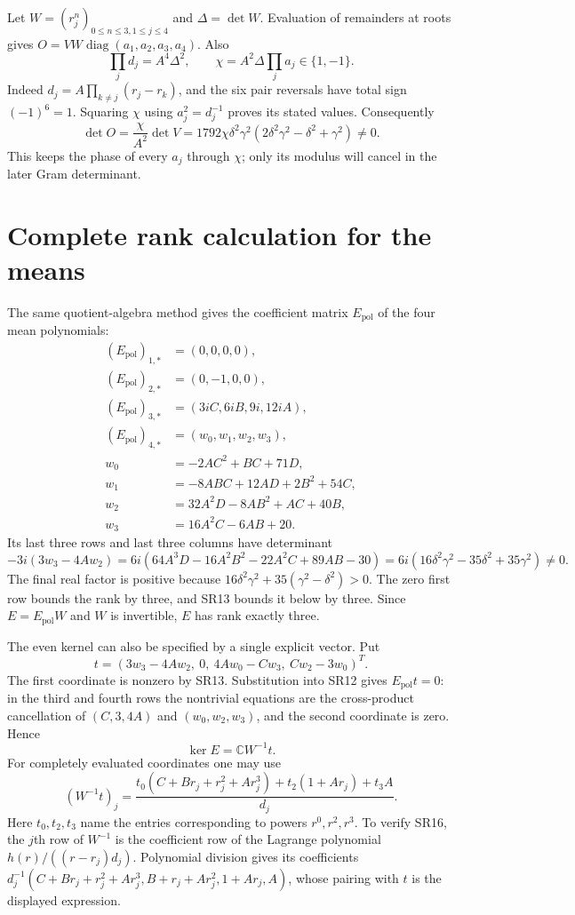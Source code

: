 \documentclass[11pt]{article}
\newcommand{\C}{\mathbb C}
\newcommand{\diag}{\operatorname{diag}}
\begin{document}
Let $W=(r_j^n)_{0\le n\le3,1\le j\le4}$ and $\Delta=\det W$.
Evaluation of remainders at roots gives
$O=VW\diag(a_1,a_2,a_3,a_4)$. Also
\[
 \prod_jd_j=A^4\Delta^2,\qquad
 \chi=A^2\Delta\prod_ja_j\in\{1,-1\}.
 \tag{SR10}
\]
Indeed $d_j=A\prod_{k\ne j}(r_j-r_k)$, and the six pair
reversals have total sign $(-1)^6=1$. Squaring $\chi$ using
$a_j^2=d_j^{-1}$ proves its stated values. Consequently
\[
 \det O=\frac{\chi}{A^2}\det V
 =1792\chi\delta^2\gamma^2
       (2\delta^2\gamma^2-\delta^2+\gamma^2)\ne0.
 \tag{SR11}
\]
This keeps the phase of every $a_j$ through $\chi$; only its
modulus will cancel in the later Gram determinant.

\section{Complete rank calculation for the means}
The same quotient-algebra method gives the coefficient matrix
$E_{\mathrm{pol}}$ of the four mean polynomials:
\[
\begin{aligned}
 (E_{\mathrm{pol}})_{1,*}&=(0,0,0,0),\\
 (E_{\mathrm{pol}})_{2,*}&=(0,-1,0,0),\\
 (E_{\mathrm{pol}})_{3,*}&=(3iC,6iB,9i,12iA),\\
 (E_{\mathrm{pol}})_{4,*}&=(w_0,w_1,w_2,w_3),\\
 w_0&=-2AC^2+BC+71D,\\
 w_1&=-8ABC+12AD+2B^2+54C,\\
 w_2&=32A^2D-8AB^2+AC+40B,\\
 w_3&=16A^2C-6AB+20.
\end{aligned}\tag{SR12}
\]
Its last three rows and last three columns have determinant
\[
 -3i(3w_3-4Aw_2)
 =6i(64A^3D-16A^2B^2-22A^2C+89AB-30)
 =6i(16\delta^2\gamma^2-35\delta^2+35\gamma^2)\ne0.
 \tag{SR13}
\]
The final real factor is positive because
$16\delta^2\gamma^2+35(\gamma^2-\delta^2)>0$.
The zero first row bounds the rank by three, and SR13 bounds
it below by three. Since $E=E_{\mathrm{pol}}W$ and $W$ is
invertible, $E$ has rank exactly three.

The even kernel can also be specified by a single explicit vector.
Put
\[
 t=(3w_3-4Aw_2,\ 0,\ 4Aw_0-Cw_3,\ Cw_2-3w_0)^T.
 \tag{SR14}
\]
The first coordinate is nonzero by SR13. Substitution into SR12
gives $E_{\mathrm{pol}}t=0$: in the third and fourth rows the
nontrivial equations are the cross-product cancellation of
$(C,3,4A)$ and $(w_0,w_2,w_3)$, and the second coordinate
is zero. Hence
\[
 \ker E=\C W^{-1}t.
 \tag{SR15}
\]
For completely evaluated coordinates one may use
\[
 (W^{-1}t)_j=
 \frac{t_0(C+Br_j+r_j^2+Ar_j^3)+t_2(1+Ar_j)+t_3A}{d_j}.
 \tag{SR16}
\]
Here $t_0,t_2,t_3$ name the entries corresponding to powers
$r^0,r^2,r^3$. To verify SR16, the $j$th row of $W^{-1}$ is
the coefficient row of the Lagrange polynomial
$h(r)/((r-r_j)d_j)$. Polynomial division gives its coefficients
$d_j^{-1}(C+Br_j+r_j^2+Ar_j^3,B+r_j+Ar_j^2,1+Ar_j,A)$,
whose pairing with $t$ is the displayed expression.
\end{document}
